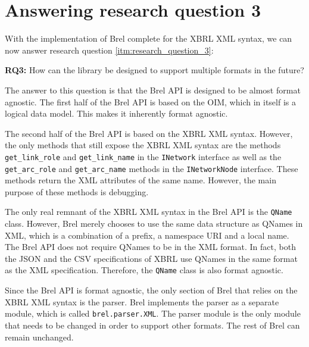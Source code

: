 \section{Answering research question 3}
\label{sec:answer_research_question_3}

With the implementation of Brel complete for the XBRL XML syntax, we can now answer research question \ref{itm:research_question_3}:

\begin{displayquote}
    \textbf{RQ3:} How can the library be designed to support multiple formats in the future?
\end{displayquote}

The answer to this question is that the Brel API is designed to be almost format agnostic.
The first half of the Brel API is based on the OIM, which in itself is a logical data model.
This makes it inherently format agnostic.

The second half of the Brel API is based on the XBRL XML syntax.
However, the only methods that still expose the XBRL XML syntax are the methods
\texttt{get\_link\_role} and \texttt{get\_link\_name} in the \texttt{INetwork} interface 
as well as the \texttt{get\_arc\_role} and \texttt{get\_arc\_name} methods in the \texttt{INetworkNode} interface.
These methods return the XML attributes of the same name.
However, the main purpose of these methods is debugging.

The only real remnant of the XBRL XML syntax in the Brel API is the \texttt{QName} class.
However, Brel merely chooses to use the same data structure as QNames in XML, 
which is a combination of a prefix, a namespace URI and a local name.
The Brel API does not require QNames to be in the XML format.
In fact, both the JSON\cite{xbrl_json} and the CSV\cite{xbrl_csv} specifications of XBRL use QNames in the same format as the XML specification.
Therefore, the \texttt{QName} class is also format agnostic.

Since the Brel API is format agnostic, the only section of Brel that relies on the XBRL XML syntax is the parser.
Brel implements the parser as a separate module, which is called \texttt{brel.parser.XML}.
The parser module is the only module that needs to be changed in order to support other formats.
The rest of Brel can remain unchanged.
